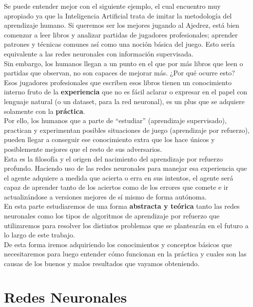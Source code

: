 \documentclass[11pt,fleqn]{book} %
\begin{document}
Se puede entender mejor con el siguiente ejemplo, el cual encuentro muy apropiado ya que la Inteligencia Artificial trata de imitar la metodología del aprendizaje humano. Si queremos ser los mejores jugando al Ajedrez, está bien comenzar a leer libros y analizar partidas de jugadores profesionales; aprender patrones y técnicas comunes así como una noción básica del juego. Esto sería equivalente a las redes neuronales con información supervisada. \\

Sin embargo, los humanos llegan a un punto en el que por más libros que leen o partidas que observan, no son capaces de mejorar más. ¿Por qué ocurre esto? Esos jugadores profesionales que escriben esos libros tienen un conocimiento interno fruto de la \textbf{experiencia} que no es fácil aclarar o expresar en el papel con lenguaje natural (o un dataset, para la red neuronal), es un plus que se adquiere solamente con la \textbf{práctica}. \\

Por ello, los humanos que a parte de ``estudiar'' (aprendizaje supervisado), practican y experimentan posibles situaciones de juego (aprendizaje por refuerzo), pueden llegar a conseguir ese conocimiento extra que los hace únicos y posiblemente mejores que el resto de sus adversarios. \\

Esta es la filosofía y el origen del nacimiento del aprendizaje por refuerzo profundo. Haciendo uso de las redes neuronales para manejar esa experiencia que el agente adquiere a medida que acierta o erra en sus intentos, el agente será capaz de aprender tanto de los aciertos como de los errores que comete e ir actualizándose a versiones mejores de sí mismo de forma autónoma. \\

En esta parte estudiaremos de una forma \textbf{abstracta y teórica} tanto las redes neuronales como los tipos de algoritmos de aprendizaje por refuerzo que utilizaremos para resolver los distintos problemas que se plantearán en el futuro a lo largo de este trabajo. \\

De esta forma iremos adquiriendo los conocimientos y conceptos básicos que necesitaremos para luego entender cómo funcionan en la práctica y cuales son las causas de los buenos y malos resultados que vayamos obteniendo.

\chapter{Redes Neuronales}\label{sec:deeplearning}
\end{document}
